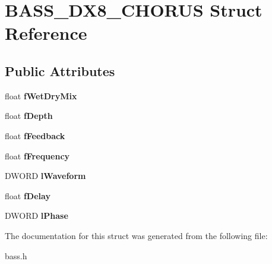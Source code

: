 \hypertarget{structBASS__DX8__CHORUS}{}\section{B\+A\+S\+S\+\_\+\+D\+X8\+\_\+\+C\+H\+O\+R\+U\+S Struct Reference}
\label{structBASS__DX8__CHORUS}
\subsection*{Public Attributes}
\begin{DoxyCompactItemize}
\item 
\hypertarget{structBASS__DX8__CHORUS_ade39ce1bf6ab4e1e4ae192491cf61dd9}{}float {\bfseries f\+Wet\+Dry\+Mix}\label{structBASS__DX8__CHORUS_ade39ce1bf6ab4e1e4ae192491cf61dd9}

\item 
\hypertarget{structBASS__DX8__CHORUS_a9255f6285c268622c30999d684e428f5}{}float {\bfseries f\+Depth}\label{structBASS__DX8__CHORUS_a9255f6285c268622c30999d684e428f5}

\item 
\hypertarget{structBASS__DX8__CHORUS_a3bbcdaa3f0e076111a62e6d9d10b77a8}{}float {\bfseries f\+Feedback}\label{structBASS__DX8__CHORUS_a3bbcdaa3f0e076111a62e6d9d10b77a8}

\item 
\hypertarget{structBASS__DX8__CHORUS_a6c28b947dcc6053c08694699625a705f}{}float {\bfseries f\+Frequency}\label{structBASS__DX8__CHORUS_a6c28b947dcc6053c08694699625a705f}

\item 
\hypertarget{structBASS__DX8__CHORUS_ada4ac1a08de4b20c7344d6a28d04a755}{}D\+W\+O\+R\+D {\bfseries l\+Waveform}\label{structBASS__DX8__CHORUS_ada4ac1a08de4b20c7344d6a28d04a755}

\item 
\hypertarget{structBASS__DX8__CHORUS_a009967698b28066520e72e3db35a57b3}{}float {\bfseries f\+Delay}\label{structBASS__DX8__CHORUS_a009967698b28066520e72e3db35a57b3}

\item 
\hypertarget{structBASS__DX8__CHORUS_a98b93f86df1f31303a62c5942ebe3c0e}{}D\+W\+O\+R\+D {\bfseries l\+Phase}\label{structBASS__DX8__CHORUS_a98b93f86df1f31303a62c5942ebe3c0e}

\end{DoxyCompactItemize}


The documentation for this struct was generated from the following file\+:\begin{DoxyCompactItemize}
\item 
bass.\+h\end{DoxyCompactItemize}
